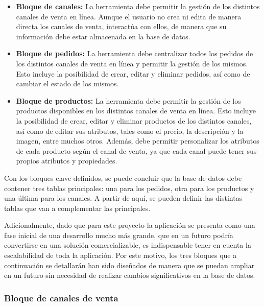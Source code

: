 \begin{itemize}
    \item \textbf{Bloque de canales:} La herramienta debe permitir la gestión de los distintos canales de venta en línea. Aunque el usuario no crea ni edita de manera directa los canales de venta, interactúa con ellos, de manera que su información debe estar almacenada en la base de datos.
    \item \textbf{Bloque de pedidos:} La herramienta debe centralizar todos los pedidos de los distintos canales de venta en línea y permitir la gestión de los mismos. Esto incluye la posibilidad de crear, editar y eliminar pedidos, así como de cambiar el estado de los mismos.
    \item \textbf{Bloque de productos:} La herramienta debe permitir la gestión de los productos disponibles en los distintos canales de venta en línea. Esto incluye la posibilidad de crear, editar y eliminar productos de los distintos canales, así como de editar sus atributos, tales como el precio, la descripción y la imagen, entre muchos otros. Además, debe permitir personalizar los atributos de cada producto según el canal de venta, ya que cada canal puede tener sus propios atributos y propiedades.
\end{itemize}

Con los bloques clave definidos, se puede concluir que la base de datos debe contener tres tablas principales: una para los pedidos, otra para los productos y una última para los canales. A partir de aquí, se pueden definir las distintas tablas que van a complementar las principales.

Adicionalmente, dado que para este proyecto la aplicación se presenta como una fase inicial de una desarrollo mucho más grande, que en un futuro podría convertirse en una solución comercializable, es indispensable tener en cuenta la escalabilidad de toda la aplicación. Por este motivo, los tres bloques que a continuación se detallarán han sido diseñados de manera que se puedan ampliar en un futuro sin necesidad de realizar cambios significativos en la base de datos.

\subsubsection{Bloque de canales de venta}

